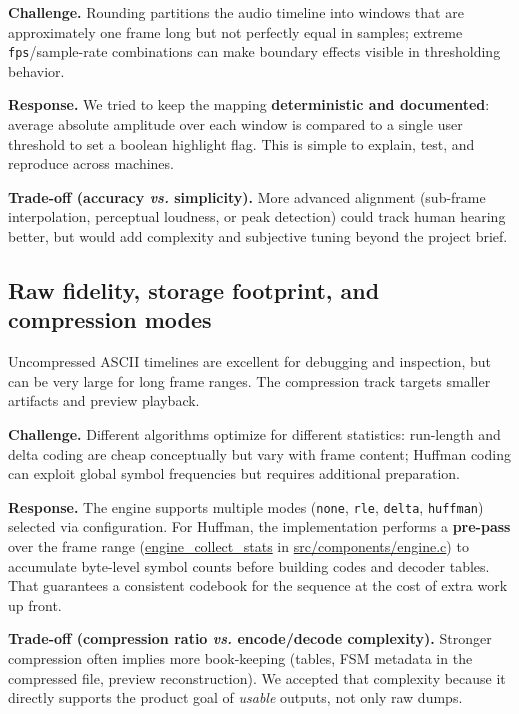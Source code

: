 \textbf{Challenge.} Rounding partitions the audio timeline into windows that are approximately one frame long but not perfectly equal in samples; extreme \texttt{fps}/sample-rate combinations can make boundary effects visible in thresholding behavior.

\textbf{Response.} We tried to keep the mapping \textbf{deterministic and documented}: average absolute amplitude over each window is compared to a single user threshold to set a boolean highlight flag. This is simple to explain, test, and reproduce across machines.

\textbf{Trade-off (accuracy \emph{vs.} simplicity).} More advanced alignment (sub-frame interpolation, perceptual loudness, or peak detection) could track human hearing better, but would add complexity and subjective tuning beyond the project brief.

\subsection{Raw fidelity, storage footprint, and compression modes}
Uncompressed ASCII timelines are excellent for debugging and inspection, but can be very large for long frame ranges. The compression track targets smaller artifacts and preview playback.

\textbf{Challenge.} Different algorithms optimize for different statistics: run-length and delta coding are cheap conceptually but vary with frame content; Huffman coding can exploit global symbol frequencies but requires additional preparation.

\textbf{Response.} The engine supports multiple modes (\texttt{none}, \texttt{rle}, \texttt{delta}, \texttt{huffman}) selected via configuration. For Huffman, the implementation performs a \textbf{pre-pass} over the frame range (\url{engine_collect_stats} in \url{src/components/engine.c}) to accumulate byte-level symbol counts before building codes and decoder tables. That guarantees a consistent codebook for the sequence at the cost of extra work up front.

\textbf{Trade-off (compression ratio \emph{vs.} encode/decode complexity).} Stronger compression often implies more book-keeping (tables, FSM metadata in the compressed file, preview reconstruction). We accepted that complexity because it directly supports the product goal of \emph{usable} outputs, not only raw dumps.

